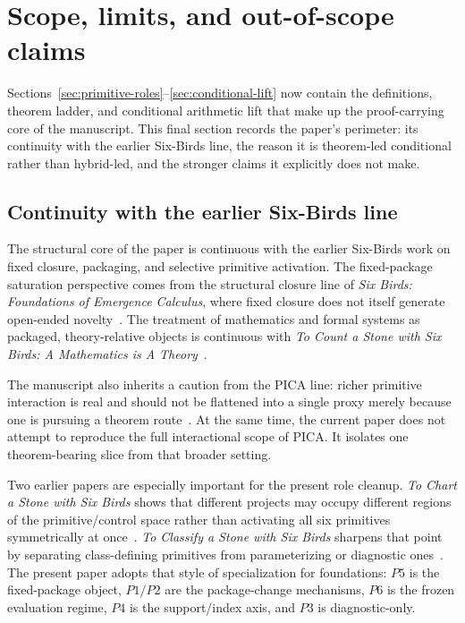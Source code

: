 \section{Scope, limits, and out-of-scope claims}\label{sec:scope-limits}

Sections~\ref{sec:primitive-roles}--\ref{sec:conditional-lift} now contain the
definitions, theorem ladder, and conditional arithmetic lift that make up the
proof-carrying core of the manuscript. This final section records the paper's
perimeter: its continuity with the earlier Six-Birds line, the reason it is
theorem-led conditional rather than hybrid-led, and the stronger claims it
explicitly does not make.

\subsection*{Continuity with the earlier Six-Birds line}

The structural core of the paper is continuous with the earlier Six-Birds work
on fixed closure, packaging, and selective primitive activation. The
fixed-package saturation perspective comes from the structural closure line of
\emph{Six Birds: Foundations of Emergence Calculus}, where fixed closure does not
itself generate open-ended novelty~\cite{Tsiokos2026Foundations}. The treatment
of mathematics and formal systems as packaged, theory-relative objects is
continuous with \emph{To Count a Stone with Six Birds: A Mathematics is A
Theory}~\cite{Tsiokos2026ToCount}.

The manuscript also inherits a caution from the PICA line: richer primitive
interaction is real and should not be flattened into a single proxy merely
because one is pursuing a theorem route~\cite{Tsiokos2026ToCreate}. At the same
time, the current paper does not attempt to reproduce the full interactional
scope of PICA. It isolates one theorem-bearing slice from that broader setting.

Two earlier papers are especially important for the present role cleanup.
\emph{To Chart a Stone with Six Birds} shows that different projects may occupy
different regions of the primitive/control space rather than activating all six
primitives symmetrically at once~\cite{Tsiokos2026ToChart}. \emph{To Classify a
Stone with Six Birds} sharpens that point by separating class-defining
primitives from parameterizing or diagnostic ones~\cite{Tsiokos2026ToClassify}.
The present paper adopts that style of specialization for foundations: \(P5\) is
the fixed-package object, \(P1/P2\) are the package-change mechanisms, \(P6\) is
the frozen evaluation regime, \(P4\) is the support/index axis, and \(P3\) is
diagnostic-only.

